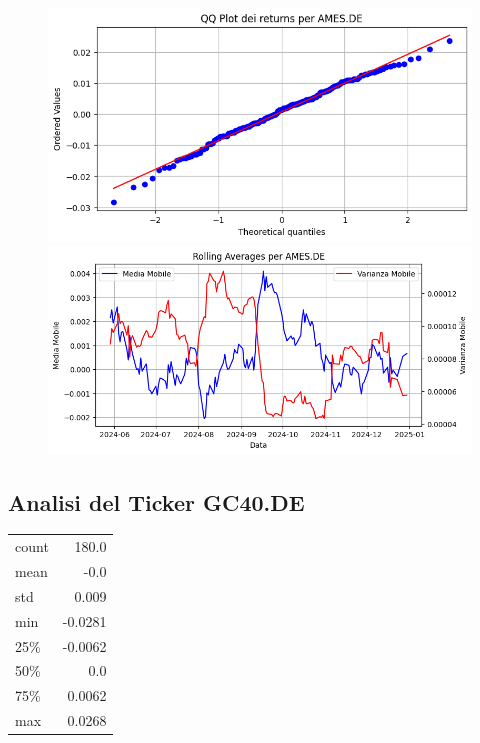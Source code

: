 \documentclass{article}%
\begin{document}
%


\begin{figure}[htbp]%
\begin{minipage}{0.48\textwidth}%
\includegraphics[width=\linewidth]{immagini_tickers/AMES.DE_qq_plot.png}%
\end{minipage}%
\begin{minipage}{0.48\textwidth}%
\includegraphics[width=\linewidth]{immagini_tickers/AMES.DE_rolling_averages.png}%
\end{minipage}%
\end{figure}

%
\subsection*{Analisi del Ticker GC40.DE}%
\label{subsec:AnalisidelTickerGC40.DE}%
\begin{tabular}{lr}%
count&180.0\\%
mean&{-}0.0\\%
std&0.009\\%
min&{-}0.0281\\%
25\%&{-}0.0062\\%
50\%&0.0\\%
75\%&0.0062\\%
max&0.0268\\%
\end{tabular}%
\end{document}
